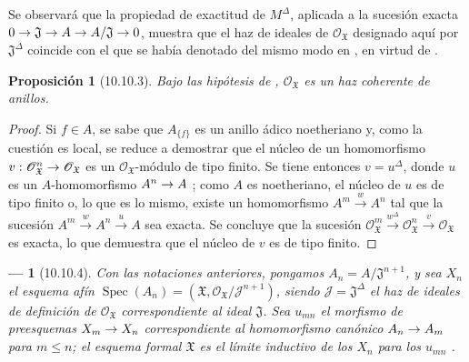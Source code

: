 \documentclass[oneside]{amsart}
\theoremstyle{ega-env-style}
\newtheorem*{env}{---}
\theoremstyle{ega-thm-env-style}
\newtheorem*{proposition}{Proposición}
\theoremstyle{ega-defn-env-style}
\def\leq{\leqslant}                 %
\renewcommand{\to}{\mathchoice{\longrightarrow}{\rightarrow}{\rightarrow}{\rightarrow}}
\newcommand{\oldpage}[2][]{{\marginnote{\normalfont{\textbf{#1}~|~#2}}}\ignorespaces}
\let\EGAOriginalLabel\label
\renewcommand{\label}[1]{\phantomsection\EGAOriginalLabel{#1}}
\begin{document}
\oldpage[I]{202}
Se observará que la propiedad de exactitud de $M^\Delta$, aplicada a la sucesión exacta $0\to\mathfrak{J}\to A\to A/\mathfrak{J}\to0$, muestra que el haz de ideales de $\mathscr{O}_{\mathfrak{X}}$ designado aquí por $\mathfrak{J}^\Delta$ coincide con el que se había denotado del mismo modo en , en virtud de .

\begin{proposition}[10.10.3]
\label{I.10.10.3}
Bajo las hipótesis de , $\mathscr{O}_{\mathfrak{X}}$ es un haz coherente de anillos.
\end{proposition}

\begin{proof}
Si $f\in A$, se sabe que $A_{\{f\}}$ es un anillo ádico noetheriano  y, como la cuestión es local, se reduce  a demostrar que el núcleo de un homomorfismo $v:\mathscr{O}_{\mathfrak{X}}^n\to\mathscr{O}_{\mathfrak{X}}$ es un $\mathscr{O}_{\mathfrak{X}}$-módulo de tipo finito.
Se tiene entonces $v=u^\Delta$, donde $u$ es un $A$-homomorfismo $A^n\to A$ ; como $A$ es noetheriano, el núcleo de $u$ es de tipo finito o, lo que es lo mismo, existe un homomorfismo $A^m\xrightarrow{w}A^n$ tal que la sucesión $A^m\xrightarrow{w}A^n\xrightarrow{u}A$ sea exacta.
Se concluye  que la sucesión $\mathscr{O}_{\mathfrak{X}}^m\xrightarrow{w^\Delta}
\mathscr{O}_{\mathfrak{X}}^n\xrightarrow{v}
\mathscr{O}_{\mathfrak{X}}$ es exacta, lo que demuestra que el núcleo de $v$ es de tipo finito.
\end{proof}

\begin{env}[10.10.4]
\label{I.10.10.4}
Con las notaciones anteriores, pongamos $A_n=A/\mathfrak{J}^{n+1}$, y sea $X_n$ el esquema afín $\operatorname{Spec}(A_n)=(\mathfrak{X},
\mathscr{O}_{\mathfrak{X}}/\mathscr{J}^{n+1})$, siendo $\mathscr{J}=\mathfrak{J}^\Delta$ el haz de ideales de definición de $\mathscr{O}_{\mathfrak{X}}$ correspondiente al ideal $\mathfrak{J}$.
Sea $u_{mn}$ el morfismo de preesquemas $X_m\to X_n$ correspondiente al homomorfismo canónico $A_n\to A_m$ para $m\leq n$; el esquema formal $\mathfrak{X}$ es el límite inductivo de los $X_n$ para los $u_{mn}$ .
\end{env}
\end{document}
